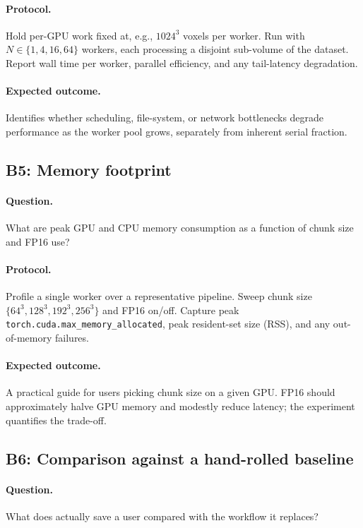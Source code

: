 \paragraph{Protocol.} Hold per-GPU work fixed at, e.g., $1024^3$ voxels per worker. Run with $N \in \{1, 4, 16, 64\}$ workers, each processing a disjoint sub-volume of the dataset. Report wall time per worker, parallel efficiency, and any tail-latency degradation.

\paragraph{Expected outcome.} Identifies whether scheduling, file-system, or network bottlenecks degrade performance as the worker pool grows, separately from inherent serial fraction.

\subsection*{B5: Memory footprint}

\paragraph{Question.} What are peak GPU and CPU memory consumption as a function of chunk size and FP16 use?

\paragraph{Protocol.} Profile a single worker over a representative pipeline. Sweep chunk size $\{64^3, 128^3, 192^3, 256^3\}$ and FP16 on/off. Capture peak \texttt{torch.cuda.max\_memory\_allocated}, peak resident-set size (RSS), and any out-of-memory failures.

\paragraph{Expected outcome.} A practical guide for users picking chunk size on a given GPU. FP16 should approximately halve GPU memory and modestly reduce latency; the experiment quantifies the trade-off.

\subsection*{B6: Comparison against a hand-rolled baseline}

\paragraph{Question.} What does \cellmapflow{} actually save a user compared with the workflow it replaces?

